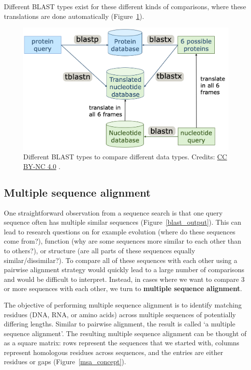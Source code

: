 
Different BLAST types exist for these different kinds of comparisons, where these translations are done automatically (Figure~\ref{blast_types}).

\begin{figure}[!htbp]
\centering
\includegraphics[width=1\linewidth]{files/blast_types-8aed2a3367dbf2bc5c263e0b04d8556e.png}
\caption[]{Different BLAST types to compare different data types. Credits: \href{https://creativecommons.org/licenses/by-nc/4.0/}{CC BY-NC 4.0} \cite{own_2_2024}.}
\label{blast_types}
\end{figure}


\subsection{Multiple sequence alignment}

One straightforward observation from a sequence search is that one query sequence often has multiple similar sequences (Figure~\ref{blast_output}). This can lead to research questions on for example evolution (where do these sequences come from?), function (why are some sequences more similar to each other than to others?), or structure (are all parts of these sequences equally similar/dissimilar?). To compare all of these sequences with each other using a pairwise alignment strategy would quickly lead to a large number of comparisons and would be difficult to interpret. Instead, in cases where we want to compare 3 or more sequences with each other, we turn to \textbf{multiple sequence alignment}.

The objective of performing multiple sequence alignment is to identify matching residues (DNA, RNA, or amino acids) across multiple sequences of potentially differing lengths. Similar to pairwise alignment, the result is called `a multiple sequence alignment'. The resulting multiple sequence alignment can be thought of as a square matrix: rows represent the sequences that we started with, columns represent homologous residues across sequences, and the entries are either residues or gaps (Figure~\ref{msa_concept}).

